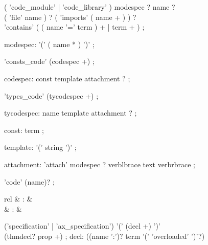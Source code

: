 \begin{isabellebody}
\begin{isamarkuptext}
  \begin{rail}
  ( 'code_module' | 'code_library' ) modespec ? name ? \\
    ( 'file' name ) ? ( 'imports' ( name + ) ) ? \\
    'contains' ( ( name '=' term ) + | term + )
  ;

  modespec: '(' ( name * ) ')'
  ;

  'consts_code' (codespec +)
  ;

  codespec: const template attachment ?
  ;

  'types_code' (tycodespec +)
  ;

  tycodespec: name template attachment ?
  ;

  const: term
  ;

  template: '(' string ')'
  ;

  attachment: 'attach' modespec ? verblbrace text verbrbrace
  ;

  'code' (name)?
  ;
  \end{rail}%
\end{isamarkuptext}%
\isamarkuptrue%
%
\isamarkuptrue%
%
\begin{isamarkuptext}%
\begin{matharray}{rcl}
    \hypertarget{command.HOL.specification}{\hyperlink{command.HOL.specification}{\mbox{}}} & : &  \\
    \hypertarget{command.HOL.ax-specification}{\hyperlink{command.HOL.ax-specification}{\mbox{}}} & : &  \\
  \end{matharray}

  \begin{rail}
  ('specification' | 'ax_specification') '(' (decl +) ')' \\ (thmdecl? prop +)
  ;
  decl: ((name ':')? term '(' 'overloaded' ')'?)
  \end{rail}


\end{isamarkuptext}
\end{isabellebody}
